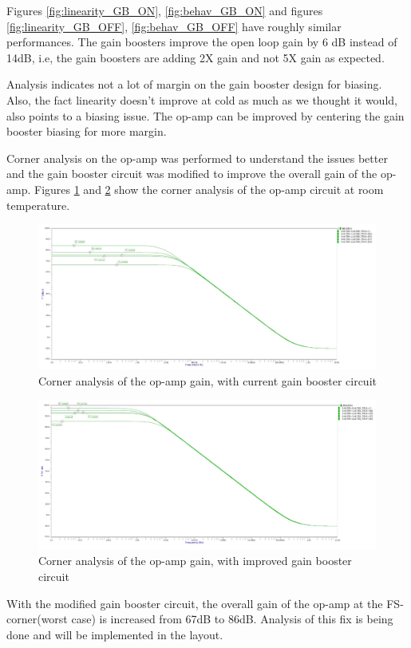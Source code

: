Figures \ref{fig:linearity_GB_ON}, \ref{fig:behav_GB_ON} and figures \ref{fig:linearity_GB_OFF}, \ref{fig:behav_GB_OFF} have roughly similar performances. The gain boosters improve the open loop gain by 6 dB instead of 14dB, i.e, the gain boosters are adding 2X gain and not 5X gain as expected. 

Analysis indicates not a lot of margin on the gain booster design for biasing. Also, the fact linearity doesn't improve at cold as much as we thought it would, also points to a biasing issue. The op-amp can be improved by centering the gain booster biasing for more margin. 

Corner analysis on the op-amp was performed to understand the issues better and the gain booster circuit was modified to improve the overall gain of the op-amp. Figures \ref{fig:opamp_gain_rt} and \ref{fig:opamp_gain_m_rt} show the corner analysis of the op-amp circuit at room temperature.

\begin{figure}[h!]
\centering
  \includegraphics[width=0.8\linewidth]{figures/prakash_fig/opamp_gain_rt.JPG}
  \caption{Corner analysis of the op-amp gain, with current gain booster circuit}
  \label{fig:opamp_gain_rt}
\end{figure}

\begin{figure}[h!]
\centering
  \includegraphics[width=0.8\linewidth]{figures/prakash_fig/opamp_gain_m_rt.JPG}
  \caption{Corner analysis of the op-amp gain, with improved gain booster circuit}
  \label{fig:opamp_gain_m_rt}
\end{figure}

With the modified gain booster circuit, the overall gain of the op-amp at the FS-corner(worst case) is increased from 67dB to 86dB. Analysis of this fix is being done and will be implemented in the layout.  
